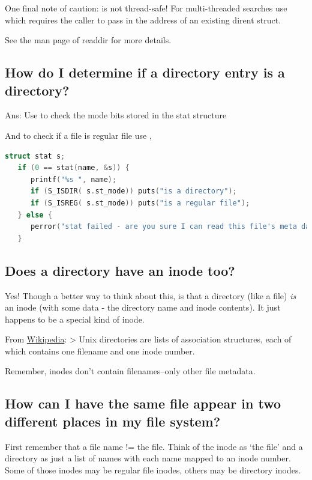 One final note of caution:  is not thread-safe! For multi-threaded searches use  which requires the caller to pass in the address of an existing dirent struct.

See the man page of readdir for more details.

\subsection{How do I determine if a directory entry is a directory?}\label{how-do-i-determine-if-a-directory-entry-is-a-directory}

Ans: Use  to check the mode bits stored in the stat structure

And to check if a file is regular file use ,

\begin{lstlisting}[language=C]
   struct stat s;
   if (0 == stat(name, &s)) {
      printf("%s ", name);
      if (S_ISDIR( s.st_mode)) puts("is a directory");
      if (S_ISREG( s.st_mode)) puts("is a regular file");
   } else {
      perror("stat failed - are you sure I can read this file's meta data?");
   }
\end{lstlisting}

\subsection{Does a directory have an inode too?}\label{does-a-directory-have-an-inode-too}

Yes! Though a better way to think about this, is that a directory (like a file) \emph{is} an inode (with some data - the directory name and inode contents). It just happens to be a special kind of inode.

From \href{http://en.wikipedia.org/wiki/Inode}{Wikipedia}: \textgreater{} Unix directories are lists of association structures, each of which contains one filename and one inode number.

Remember, inodes don't contain filenames--only other file metadata.

\subsection{How can I have the same file appear in two different places in my file system?}\label{how-can-i-have-the-same-file-appear-in-two-different-places-in-my-file-system}

First remember that a file name != the file. Think of the inode as `the file' and a directory as just a list of names with each name mapped to an inode number. Some of those inodes may be regular file inodes, others may be directory inodes.

